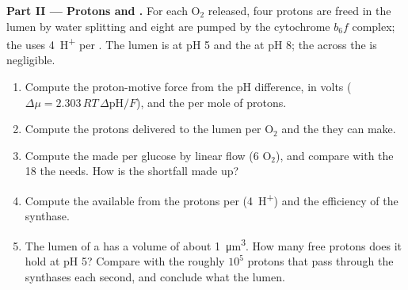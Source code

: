 \begin{problem}
\medskip
\noindent\textbf{Part II --- Protons and .}
For each $\mathrm{O_2}$ released, four protons are freed in the lumen
by water splitting and eight are pumped by the cytochrome $b_6f$
complex; the  uses \qty{4}{H^+} per . The lumen is at
pH 5 and the  at pH 8; the  across the
 is negligible.
\begin{enumerate}[resume]
  \item Compute the proton-motive force from the pH difference, in
        volts ($\Delta\mu = 2.303\,RT\,\Delta\mathrm{pH}/F$), and the
         per mole of protons.
  \item Compute the protons delivered to the lumen per $\mathrm{O_2}$
        and the  they can make.
  \item Compute the  made per glucose by linear flow (6
        $\mathrm{O_2}$), and compare with the 18 the 
        needs. How is the shortfall made up?
  \item Compute the  available from the protons per 
        (\qty{4}{H^+}) and the efficiency of the synthase.
  \item The lumen of a  has a volume of about
        \qty{1}{\micro m^3}. How many free protons does it hold at pH
        5? Compare with the roughly $10^5$ protons that pass through
        the synthases each second, and conclude what  the
        lumen.
\end{enumerate}


\end{problem}
